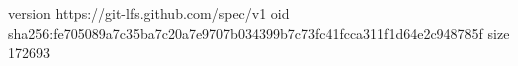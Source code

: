 version https://git-lfs.github.com/spec/v1
oid sha256:fe705089a7c35ba7c20a7e9707b034399b7c73fc41fcca311f1d64e2c948785f
size 172693
